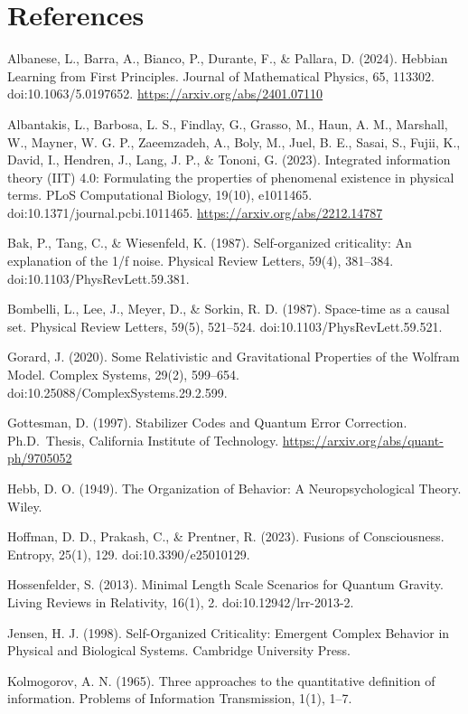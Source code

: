 \documentclass[11pt,oneside]{report}
\theoremstyle{definition}
\theoremstyle{remark}
\newenvironment{reflist}
  {\par\small\setlength{\parindent}{0pt}%
   \setlength{\leftskip}{1.6em}\setlength{\parindent}{-1.6em}%
   \setlength{\parskip}{0.4em}%
   \raggedright\hyphenpenalty=50\exhyphenpenalty=50\relax
   \sloppy}
  {\par}
\begin{document}
\section*{References}
\begin{reflist}
Albanese, L., Barra, A., Bianco, P., Durante, F., \& Pallara, D. (2024).
Hebbian Learning from First Principles. Journal of Mathematical Physics,
65, 113302. doi:10.1063/5.0197652.
\url{https://arxiv.org/abs/2401.07110}

Albantakis, L., Barbosa, L. S., Findlay, G., Grasso, M., Haun, A. M.,
Marshall, W., Mayner, W. G. P., Zaeemzadeh, A., Boly, M., Juel, B. E.,
Sasai, S., Fujii, K., David, I., Hendren, J., Lang, J. P., \& Tononi, G.
(2023). Integrated information theory (IIT) 4.0: Formulating the
properties of phenomenal existence in physical terms. PLoS Computational
Biology, 19(10), e1011465. doi:10.1371/journal.pcbi.1011465.
\url{https://arxiv.org/abs/2212.14787}

Bak, P., Tang, C., \& Wiesenfeld, K. (1987). Self-organized criticality:
An explanation of the 1/f noise. Physical Review Letters, 59(4),
381--384. doi:10.1103/PhysRevLett.59.381.

Bombelli, L., Lee, J., Meyer, D., \& Sorkin, R. D. (1987). Space-time as
a causal set. Physical Review Letters, 59(5), 521--524.
doi:10.1103/PhysRevLett.59.521.

Gorard, J. (2020). Some Relativistic and Gravitational Properties of the
Wolfram Model. Complex Systems, 29(2), 599--654.
doi:10.25088/ComplexSystems.29.2.599.

Gottesman, D. (1997). Stabilizer Codes and Quantum Error Correction.
Ph.D.~Thesis, California Institute of Technology.
\url{https://arxiv.org/abs/quant-ph/9705052}

Hebb, D. O. (1949). The Organization of Behavior: A Neuropsychological
Theory. Wiley.

Hoffman, D. D., Prakash, C., \& Prentner, R. (2023). Fusions of
Consciousness. Entropy, 25(1), 129. doi:10.3390/e25010129.

Hossenfelder, S. (2013). Minimal Length Scale Scenarios for Quantum
Gravity. Living Reviews in Relativity, 16(1), 2.
doi:10.12942/lrr-2013-2.

Jensen, H. J. (1998). Self-Organized Criticality: Emergent Complex
Behavior in Physical and Biological Systems. Cambridge University Press.

Kolmogorov, A. N. (1965). Three approaches to the quantitative
definition of information. Problems of Information Transmission, 1(1),
1--7.


\end{reflist}
\end{document}
